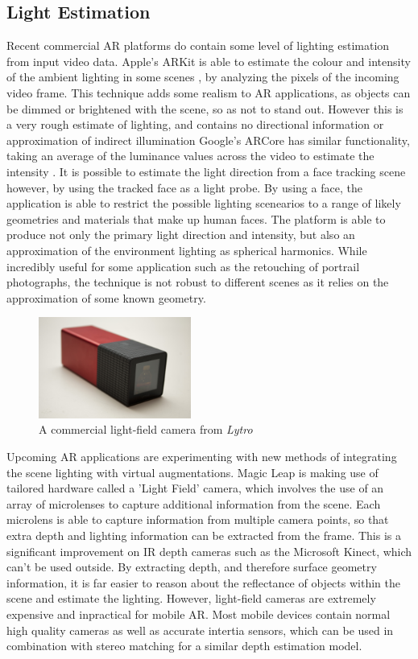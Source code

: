 \documentclass[ %
                    author={Gavin Parker},
                supervisor={Dr. Neill Campbell},
                    degree={MEng},
                     title={Deep Siamese Networks for Illumination Estimation from Stereo Images},
                  subtitle={},
                      type={research},
                      year={2018} ]{dissertation}
\begin{document}
\subsection{Light Estimation}
Recent commercial AR platforms do contain some level of lighting estimation from input video data. Apple's ARKit is able to estimate the colour and intensity of the ambient lighting in some scenes \cite{arkit1}, by analyzing the pixels of the incoming video frame. This technique adds some realism to AR applications, as objects can be dimmed or brightened with the scene, so as not to stand out. However this is a very rough estimate of lighting, and contains no directional information or approximation of indirect illumination  Google's ARCore has similar functionality, taking an average of the luminance values across the video to estimate the intensity \cite{Debevec:1998:RSO:280814.280864}. It is possible to estimate the light direction from a face tracking scene however, by using the tracked face as a light probe. By using a face, the application is able to restrict the possible lighting scenearios to a range of likely geometries and materials that make up human faces. The platform is able to produce not only the primary light direction and intensity, but also an approximation of the environment lighting as spherical harmonics. While incredibly useful for some application such as the retouching of portrail photographs, the technique is not robust to different scenes as it relies on the approximation of some known geometry.
\begin{figure}
\includegraphics[width=5cm]{images/lytro}
\centering
\caption{A commercial light-field camera from \textit{Lytro}}
\end{figure}
\newline
Upcoming AR applications are experimenting with new methods of integrating the scene lighting with virtual augmentations. Magic Leap is making use of tailored hardware called a 'Light Field' camera, which involves the use of an array of microlenses to capture additional information from the scene. Each microlens is able to capture information from multiple camera points, so that extra depth and lighting information can be extracted from the frame. This is a significant improvement on IR depth cameras such as the Microsoft Kinect, which can't be used outside. By extracting depth, and therefore surface geometry information, it is far easier to reason about the reflectance of objects within the scene and estimate the lighting. However, light-field cameras are extremely expensive and inpractical for mobile AR. Most mobile devices contain normal high quality cameras as well as accurate intertia sensors, which can be used in combination with stereo matching for a similar depth estimation model.
\end{document}
